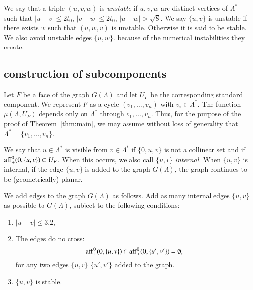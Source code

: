 We say that a triple $(u,v,w)$ is {\it unstable}
if $u,v,w$ are distinct vertices of $\Lambda^*$ such
that $|u-v|\le 2t_0$, $|v-w|\le 2t_0$, $|u-w|>\sqrt8$.
We say $\{u,v\}$ is unstable if there exists $w$ such that $(u,w,v)$
is unstable.  Otherwise it is said to be stable.
We also avoid unstable edges $\{u,w\}$.
because of the numerical instabilities they create.


\subsection{construction of subcomponents}

Let $F$ be a face of the graph $G(\Lambda)$ and let $U_F$ be the
corresponding standard component.  We represent $F$ as a cycle
$(v_1,\ldots,v_n)$ with $v_i\in\Lambda^*$.  The function
$\mu(\Lambda,U_F)$ depends only on $\Lambda^*$ through
$v_1,\ldots,v_n$.  Thus, for the purpose of the proof of
Theorem~\ref{thm:main}, we may assume without loss of generality
that $\Lambda^* = \{v_1,\ldots,v_n\}$.

We say that $u\in\Lambda^*$ is visible from $v\in\Lambda^*$ if
$\{0,u,v\}$ is not a collinear set and if
${\operatorname{aff}}_+^0(0,\{u,v\})\subset U_F$.  When this occurs, we
also call $\{u,v\}$ {\it internal}.  When $\{u,v\}$
is  internal, if the edge $\{u,v\}$ is added to the
graph $G(\Lambda)$, the graph continues to be (geometrically) planar.



We add edges to the graph $G(\Lambda)$ 
as follows.  
Add as many internal edges $\{u,v\}$ as possible to $G(\Lambda)$, subject
to the following conditions:
\begin{enumerate}
\item  $|u-v|\le3.2$, 
\item The edges do no cross:
  $$%
  \op{aff}_+^0(0,\{u,v\}) \cap \op{aff}_+^0(0,\{u',v'\}) = \emptyset,
  $$%
for any two edges $\{u,v\}$ $\{u',v'\}$ added to the graph.
\item  $\{u,v\}$ is stable.
\end{enumerate}  

